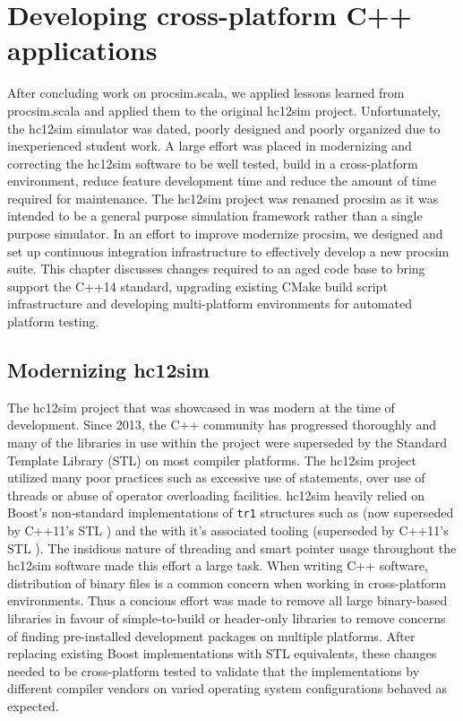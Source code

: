 \chapter{Developing cross-platform C++ applications}
\label{ch:cross-platform}

\newcommand{\cmakeinline}[1]{\texttt{#1}}
    
After concluding work on procsim.scala, we applied lessons learned from procsim.scala and applied them to the original hc12sim project. Unfortunately, the hc12sim simulator was dated, poorly designed and poorly organized due to inexperienced student work. A large effort was placed in modernizing and correcting the hc12sim software to be well tested, build in a cross-platform environment, reduce feature development time and reduce the amount of time required for maintenance. The hc12sim project was renamed procsim as it was intended to be a general purpose simulation framework rather than a single purpose \hcmodel{} simulator. In an effort to improve modernize procsim, we designed and set up continuous integration infrastructure to effectively develop a new procsim suite. This chapter discusses changes required to an aged code base to bring support the C++14 standard, upgrading existing CMake \cite{Kitware:CMake} build script infrastructure and developing multi-platform environments for automated platform testing.

\section{Modernizing hc12sim}
\label{sec:cross-platform:sec:modernizing}

The hc12sim project that was showcased in \cite{Brightwell2013} was modern at the time of development. Since 2013, the C++ community has progressed thoroughly and many of the libraries in use within the project were superseded by the Standard Template Library (STL) on most compiler platforms. The hc12sim project utilized many poor practices such as excessive use of  statements, over use of threads or abuse of operator overloading facilities. hc12sim heavily relied on Boost's non-standard implementations of \verb|tr1| structures such as  \cite{Boost1.53.0:SmartPointers} (now superseded by C++11's STL  \cite{cppreference:shared-ptr}) and the  with it's associated tooling \cite{Boost1.53.0:Thread} (superseded by C++11's STL  \cite{cppreference:thread}). The insidious nature of threading and smart pointer usage throughout the hc12sim software made this effort a large task. When writing C++ software, distribution of binary files is a common concern when working in cross-platform environments. Thus a concious effort was made to remove all large binary-based libraries in favour of simple-to-build or header-only libraries to remove concerns of finding pre-installed development packages on multiple platforms. After replacing existing Boost implementations with STL equivalents, these changes needed to be cross-platform tested to validate that the implementations by different compiler vendors on varied operating system configurations behaved as expected.



